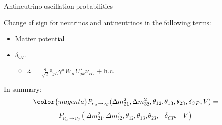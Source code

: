 \begin{frame}{Antineutrino oscillation probabilities}

Change of sign for neutrinos and antineutrinos in the following terms:
\begin{itemize}
  \item Matter potential
  \item $\delta_{CP}$
  \begin{itemize}
    \item $\displaystyle
           \mathcal{L} =
           \frac{g}{\sqrt{2}}
           \bar{e}_{jL} \gamma^{\mu} W^{-}_{\mu} U^{\star}_{jk} \nu_{kL}$ + h.c.
  \end{itemize}
\end{itemize}

\vspace{0.5cm}
In summary:
\begin{equation*}
  \displaystyle
  {\color{magenta}
    P_{\bar{\nu}_{\alpha} \rightarrow \bar{\nu}_{\beta}}(
      {\Delta}m^2_{21}, {\Delta}m^2_{32}, \theta_{12}, \theta_{13}, \theta_{23}, \delta_{CP}, V)
  }
  =
\end{equation*}
\begin{equation*}
  \displaystyle
    P_{\nu_{\alpha} \rightarrow \nu_{\beta}}(
       {\Delta}m^2_{21}, {\Delta}m^2_{32}, \theta_{12}, \theta_{13}, \theta_{23}, -\delta_{CP}, -V)
\end{equation*}

\end{frame}

%
%
%
%
%
%

